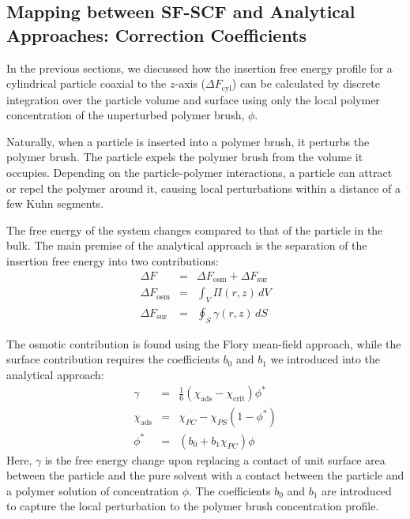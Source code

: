 \documentclass[10pt, a4paper]{article}
\begin{document}
\subsection*{Mapping between SF-SCF and Analytical Approaches: Correction Coefficients}
\begin{multicols}{2}

In the previous sections, we discussed how the insertion free energy profile for a cylindrical particle coaxial to the $z$-axis ($\Delta F_{\textrm{cyl}}$) can be calculated by discrete integration over the particle volume and surface using only the local polymer concentration of the unperturbed polymer brush, $\phi$.

Naturally, when a particle is inserted into a polymer brush, it perturbs the polymer brush.
The particle expels the polymer brush from the volume it occupies.
Depending on the particle-polymer interactions, a particle can attract or repel the polymer around it, causing local perturbations within a distance of a few Kuhn segments.

The free energy of the system changes compared to that of the particle in the bulk.
The main premise of the analytical approach is the separation of the insertion free energy into two contributions:
\begin{eqnarray}
    \label{eq:Delta_F} \Delta F &=& \Delta F_{\textrm{osm}} + \Delta F_{\textrm{sur}} \\
    \label{eq:Delta_F_V} \Delta F_{\textrm{osm}} &=& \int_{V} \Pi(r, z) \, dV \\
    \label{eq:Delta_F_S} \Delta F_{\textrm{sur}} &=& \oint_{S} \gamma(r, z) \, dS
\end{eqnarray}

The osmotic contribution is found using the Flory mean-field approach, while the surface contribution requires the coefficients $b_0$ and $b_1$ we introduced into the analytical approach:
\begin{eqnarray}
    \gamma &=& \frac{1}{6} (\chi_{\textrm{ads}} - \chi_{\textrm{crit}}) \phi^{\ast} \\
    \chi_{\textrm{ads}} &=& \chi_{PC} - \chi_{PS} (1 - \phi^{\ast}) \\
    \phi^{\ast} &=& (b_0 + b_1 \chi_{PC}) \phi \label{eq:phi_correction}
\end{eqnarray}
Here, $\gamma$ is the free energy change upon replacing a contact of unit surface area between the particle and the pure solvent with a contact between the particle and a polymer solution of concentration $\phi$.
The coefficients $b_0$ and $b_1$ are introduced to capture the local perturbation to the polymer brush concentration profile.


\end{multicols}
\end{document}
